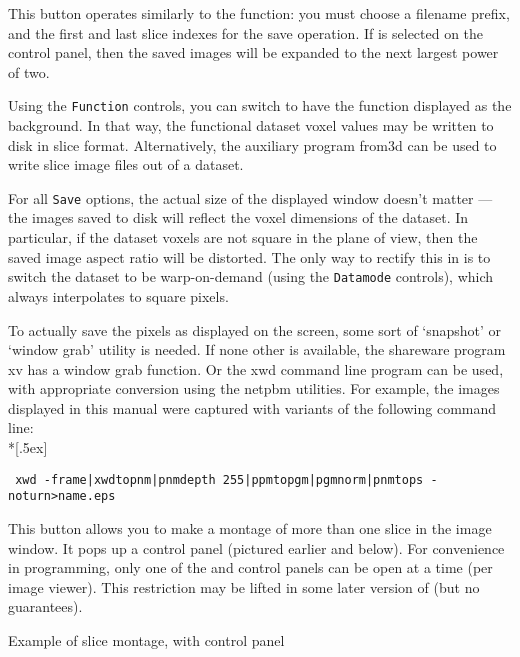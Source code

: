\begin{description}
   This button operates similarly to the  function:
   you must choose a filename prefix, and the first and last slice
   indexes for the save operation.
   If  is selected on the  control panel,
   then the saved images will be expanded to the next largest power of
   two.

   Using the {\tt Function} controls, you can
   switch to have the function displayed as the background.
   In that way, the functional dataset voxel values may be written to
   disk in slice format.  Alternatively, the auxiliary program {\sf from3d}
   can be used to write slice image files out of a dataset.
\end{description}
For all {\tt Save} options, the actual size of the displayed
window doesn't matter ---
the images saved to disk will reflect the voxel dimensions of
the dataset.  In particular, if the dataset voxels are not square
in the plane of view, then the saved image aspect ratio will be
distorted.  The only way to rectify this in \afnit is to switch
the dataset to be warp-on-demand (using the {\tt Datamode} controls),
which always interpolates to square pixels.

To actually save the pixels
as displayed on the screen, some sort of `snapshot' or `window grab'
utility is needed.  If none other is available, the shareware program
{\sf xv} has a window grab function.  Or the {\sf xwd} command line
program can be used, with appropriate conversion using the {\sf netpbm}
utilities.  For example, the images displayed in this manual were
captured with variants of the following command line:\\*[.5ex]
\centerline{\tt
  xwd -frame|xwdtopnm|pnmdepth 255|ppmtopgm|pgmnorm|pnmtops -noturn>name.eps}

This button allows you to make a montage of more than one slice
in the image window.  It pops up a control panel (pictured earlier and below).
For convenience in programming, only one of the  and 
control panels can be open at a time (per image viewer).  This restriction
may be lifted in some later version of \afnit (but no guarantees).\\[2ex]
\goodbreak\begin{samepage}
\centerline{\epsfxsize=5in}\vspace{2ex}
\centerline{\sf Example of slice montage, with  control panel}\vspace{1ex}
\end{samepage}\goodbreak


